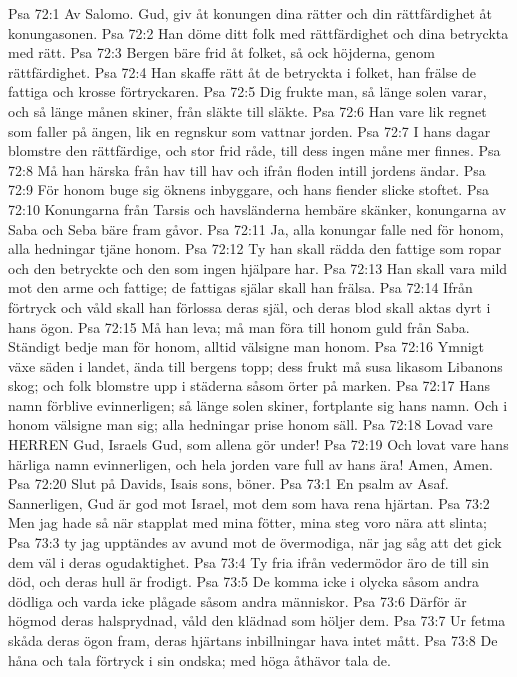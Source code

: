 Psa 72:1  Av Salomo. Gud, giv åt konungen dina rätter och din rättfärdighet åt konungasonen.
Psa 72:2  Han döme ditt folk med rättfärdighet och dina betryckta med rätt.
Psa 72:3  Bergen bäre frid åt folket, så ock höjderna, genom rättfärdighet.
Psa 72:4  Han skaffe rätt åt de betryckta i folket, han frälse de fattiga och krosse förtryckaren.
Psa 72:5  Dig frukte man, så länge solen varar, och så länge månen skiner, från släkte till släkte.
Psa 72:6  Han vare lik regnet som faller på ängen, lik en regnskur som vattnar jorden.
Psa 72:7  I hans dagar blomstre den rättfärdige, och stor frid råde, till dess ingen måne mer finnes.
Psa 72:8  Må han härska från hav till hav och ifrån floden intill jordens ändar.
Psa 72:9  För honom buge sig öknens inbyggare, och hans fiender slicke stoftet.
Psa 72:10  Konungarna från Tarsis och havsländerna hembäre skänker, konungarna av Saba och Seba bäre fram gåvor.
Psa 72:11  Ja, alla konungar falle ned för honom, alla hedningar tjäne honom.
Psa 72:12  Ty han skall rädda den fattige som ropar och den betryckte och den som ingen hjälpare har.
Psa 72:13  Han skall vara mild mot den arme och fattige; de fattigas själar skall han frälsa.
Psa 72:14  Ifrån förtryck och våld skall han förlossa deras själ, och deras blod skall aktas dyrt i hans ögon.
Psa 72:15  Må han leva; må man föra till honom guld från Saba. Ständigt bedje man för honom, alltid välsigne man honom.
Psa 72:16  Ymnigt växe säden i landet, ända till bergens topp; dess frukt må susa likasom Libanons skog; och folk blomstre upp i städerna såsom örter på marken.
Psa 72:17  Hans namn förblive evinnerligen; så länge solen skiner, fortplante sig hans namn. Och i honom välsigne man sig; alla hedningar prise honom säll.
Psa 72:18  Lovad vare HERREN Gud, Israels Gud, som allena gör under!
Psa 72:19  Och lovat vare hans härliga namn evinnerligen, och hela jorden vare full av hans ära! Amen, Amen.
Psa 72:20  Slut på Davids, Isais sons, böner.
Psa 73:1  En psalm av Asaf. Sannerligen, Gud är god mot Israel, mot dem som hava rena hjärtan.
Psa 73:2  Men jag hade så när stapplat med mina fötter, mina steg voro nära att slinta;
Psa 73:3  ty jag upptändes av avund mot de övermodiga, när jag såg att det gick dem väl i deras ogudaktighet.
Psa 73:4  Ty fria ifrån vedermödor äro de till sin död, och deras hull är frodigt.
Psa 73:5  De komma icke i olycka såsom andra dödliga och varda icke plågade såsom andra människor.
Psa 73:6  Därför är högmod deras halsprydnad, våld den klädnad som höljer dem.
Psa 73:7  Ur fetma skåda deras ögon fram, deras hjärtans inbillningar hava intet mått.
Psa 73:8  De håna och tala förtryck i sin ondska; med höga åthävor tala de.
